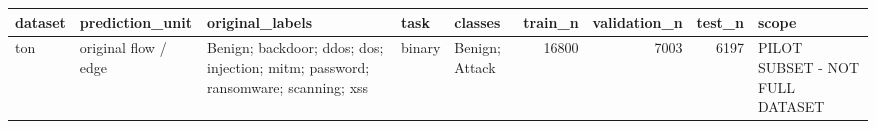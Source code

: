 \begin{tabular}{lllllrrrl}
\toprule
dataset & prediction\_unit & original\_labels & task & classes & train\_n & validation\_n & test\_n & scope \\
\midrule
ton & original flow / edge & Benign; backdoor; ddos; dos; injection; mitm; password; ransomware; scanning; xss & binary & Benign; Attack & 16800 & 7003 & 6197 & PILOT SUBSET - NOT FULL DATASET \\
\bottomrule
\end{tabular}
